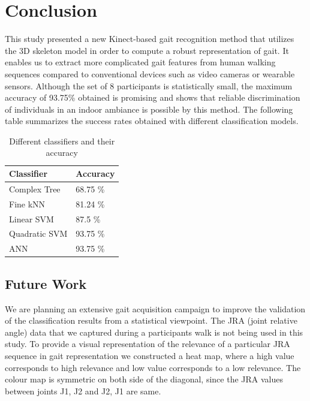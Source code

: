 \chapter{Conclusion} \label{Conclusion}

\noindent This study presented a new Kinect-based gait recognition method that utilizes the 3D skeleton model in order to compute a robust representation of gait. It enables us to extract more complicated gait features from human walking sequences compared to conventional devices such as video cameras or wearable sensors. Although the set of 8 participants is statistically small, the maximum accuracy of 93.75\% obtained is promising and shows that reliable discrimination of individuals in an indoor ambiance is possible by this method. The following table summarizes the success rates obtained with different classification models.

\def\arraystretch{1.3}
\begin{table}[h]
\centering
\begin{tabular}{| p{3cm} | |p{3cm}|}
 \hline
\cellcolor{pink} Classifier & \cellcolor{pink} Accuracy \\ \hline
Complex Tree & 68.75 \% \\ \hline
Fine kNN & 81.24 \% \\ \hline
Linear SVM & 87.5 \% \\\hline
Quadratic SVM & 93.75 \% \\ \hline
ANN & 93.75 \% \\ \hline
\end{tabular}
\caption{ Different classifiers and their accuracy}
\end{table}

\newpage
\section{Future Work} \label{Future Work}
\noindent We are planning an extensive gait acquisition campaign to improve the validation of the classification results from a statistical viewpoint. The JRA (joint relative angle) data that we captured during a participants walk is not being used in this study. To provide a visual representation of the relevance of a particular JRA sequence in gait representation we constructed a heat map, where a high value corresponds to high relevance and low value corresponds to a low relevance. The colour map is symmetric on both side of the diagonal, since the JRA values between joints {J1, J2} and {J2, J1} are same.

